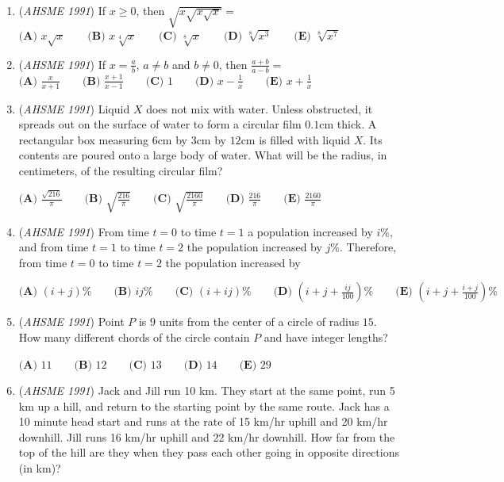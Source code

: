\begin{enumerate}
	\item (\textit{AHSME 1991}) If $x\geq 0$, then $\sqrt{x\sqrt{x\sqrt{x}}}=$
$\textbf{(A) } x\sqrt{x}\qquad \textbf{(B) } x\sqrt[4]{x}\qquad \textbf{(C) } \sqrt[8]{x}\qquad \textbf{(D) } \sqrt[8]{x^3}\qquad \textbf{(E) } \sqrt[8]{x^7}$


	\item (\textit{AHSME 1991}) If $x=\frac{a}{b}$, $a\neq b$ and $b\neq 0$, then $\frac{a+b}{a-b}=$
$\textbf{(A) } \frac{x}{x+1} \qquad \textbf{(B) } \frac{x+1}{x-1} \qquad \textbf{(C) } 1 \qquad \textbf{(D) } x-\frac{1}{x} \qquad \textbf{(E) } x+\frac{1}{x}$


	\item (\textit{AHSME 1991}) Liquid $X$ does not mix with water. Unless obstructed, it spreads out on the surface of water to form a circular film $0.1$cm thick. A rectangular box measuring $6$cm by $3$cm by $12$cm is filled with liquid $X$. Its contents are poured onto a large body of water. What will be the radius, in centimeters, of the resulting circular film?


 $\textbf{(A) } \frac{\sqrt{216}}{\pi} \qquad \textbf{(B) }\sqrt{\frac{216}{\pi}} \qquad \textbf{(C) } \sqrt{\frac{2160}{\pi}} \qquad \textbf{(D) } \frac{216}{\pi} \qquad \textbf{(E) } \frac{2160}{\pi}$


	\item (\textit{AHSME 1991}) From time $t=0$ to time $t=1$ a population increased by $i\%$, and from time $t=1$ to time $t=2$ the population increased by $j\%$. Therefore, from time $t=0$ to time $t=2$ the population increased by


 $\textbf{(A) } (i+j)\% \qquad \textbf{(B) } ij\% \qquad \textbf{(C) } (i+ij)\% \qquad \textbf{(D) } \left(i+j+\frac{ij}{100}\right)\% \qquad \textbf{(E) } \left(i+j+\frac{i+j}{100}\right)\%$


	\item (\textit{AHSME 1991}) Point $P$ is $9$ units from the center of a circle of radius $15$. How many different chords of the circle contain $P$ and have integer lengths?


 $\textbf{(A) } 11\qquad \textbf{(B) } 12\qquad \textbf{(C) } 13\qquad \textbf{(D) } 14\qquad \textbf{(E) } 29$


	\item (\textit{AHSME 1991}) Jack and Jill run 10 km. They start at the same point, run 5 km up a hill, and return to the starting point by the same route. Jack has a 10 minute head start and runs at the rate of 15 km/hr uphill and 20 km/hr downhill. Jill runs 16 km/hr uphill and 22 km/hr downhill. How far from the top of the hill are they when they pass each other going in opposite directions (in km)?



\end{enumerate}
